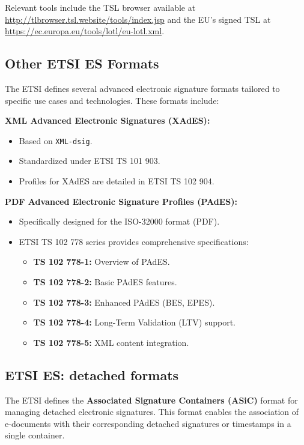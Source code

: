 Relevant tools include the TSL browser available at
\url{http://tlbrowser.tsl.website/tools/index.jsp} and the EU's signed
TSL at \url{https://ec.europa.eu/tools/lotl/eu-lotl.xml}.

\subsection{Other ETSI ES Formats}

The ETSI defines several advanced electronic signature formats
tailored to specific use cases and technologies. These formats
include:

\textbf{XML Advanced Electronic Signatures (XAdES):}
\begin{itemize}
    \item Based on \texttt{XML-dsig}.
    \item Standardized under ETSI TS 101 903.
    \item Profiles for XAdES are detailed in ETSI TS 102 904.
\end{itemize}

\textbf{PDF Advanced Electronic Signature Profiles (PAdES):}
\begin{itemize}
    \item Specifically designed for the ISO-32000 format (PDF).
    \item ETSI TS 102 778 series provides comprehensive
      specifications:
    \begin{itemize}
        \item \textbf{TS 102 778-1:} Overview of PAdES.
        \item \textbf{TS 102 778-2:} Basic PAdES features.
        \item \textbf{TS 102 778-3:} Enhanced PAdES (BES, EPES).
        \item \textbf{TS 102 778-4:} Long-Term Validation (LTV)
          support.
        \item \textbf{TS 102 778-5:} XML content integration.
    \end{itemize}
\end{itemize}

\subsection{ETSI ES: detached formats}

The ETSI defines the \textbf{Associated Signature Containers (ASiC)}
format for managing detached electronic signatures. This format
enables the association of e-documents with their corresponding
detached signatures or timestamps in a single container.


